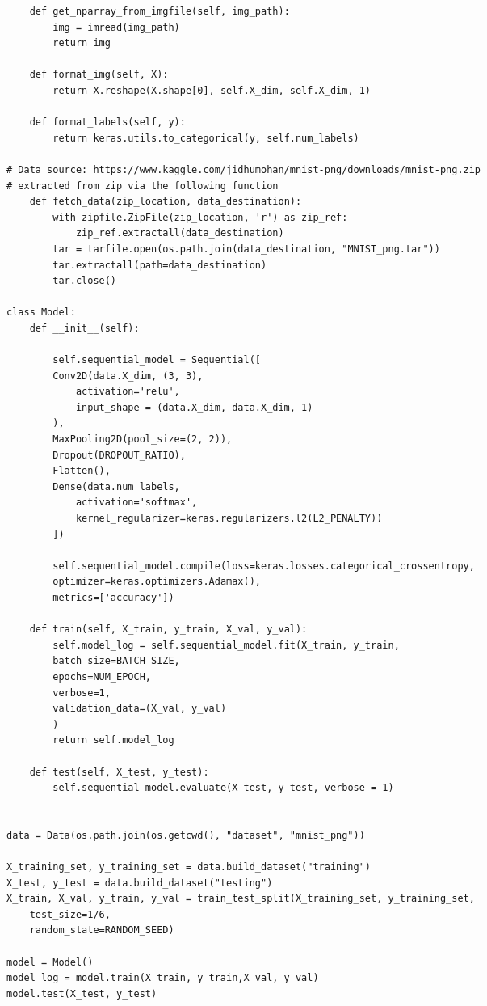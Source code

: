 \documentclass[12pt]{article}
\begin{document}
\begin{adjustwidth}{-50pt}{0pt}
\begin{Verbatim}
	def get_nparray_from_imgfile(self, img_path):
		img = imread(img_path)
		return img

	def format_img(self, X):
		return X.reshape(X.shape[0], self.X_dim, self.X_dim, 1)
	
	def format_labels(self, y):
		return keras.utils.to_categorical(y, self.num_labels)

# Data source: https://www.kaggle.com/jidhumohan/mnist-png/downloads/mnist-png.zip
# extracted from zip via the following function
	def fetch_data(zip_location, data_destination):
		with zipfile.ZipFile(zip_location, 'r') as zip_ref:
			zip_ref.extractall(data_destination)
		tar = tarfile.open(os.path.join(data_destination, "MNIST_png.tar"))
		tar.extractall(path=data_destination)
		tar.close()

class Model:
	def __init__(self):
	
		self.sequential_model = Sequential([
		Conv2D(data.X_dim, (3, 3),
			activation='relu',
			input_shape = (data.X_dim, data.X_dim, 1)
		),
		MaxPooling2D(pool_size=(2, 2)),
		Dropout(DROPOUT_RATIO),
		Flatten(),
		Dense(data.num_labels,
			activation='softmax',
			kernel_regularizer=keras.regularizers.l2(L2_PENALTY))
		])
		
		self.sequential_model.compile(loss=keras.losses.categorical_crossentropy,
		optimizer=keras.optimizers.Adamax(),
		metrics=['accuracy'])
	
	def train(self, X_train, y_train, X_val, y_val):
		self.model_log = self.sequential_model.fit(X_train, y_train,
		batch_size=BATCH_SIZE,
		epochs=NUM_EPOCH,
		verbose=1,
		validation_data=(X_val, y_val)
		)
		return self.model_log
		
	def test(self, X_test, y_test):
		self.sequential_model.evaluate(X_test, y_test, verbose = 1)


data = Data(os.path.join(os.getcwd(), "dataset", "mnist_png"))

X_training_set, y_training_set = data.build_dataset("training")
X_test, y_test = data.build_dataset("testing")
X_train, X_val, y_train, y_val = train_test_split(X_training_set, y_training_set,
	test_size=1/6,
	random_state=RANDOM_SEED)

model = Model()
model_log = model.train(X_train, y_train,X_val, y_val)
model.test(X_test, y_test)
\end{Verbatim}
\end{adjustwidth}
\end{document}
